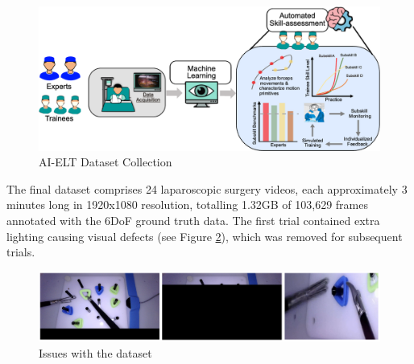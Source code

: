 \begin{figure}[tbp]
    \centering
    \vspace*{-2.5mm}
    \includegraphics[width=1\linewidth]{dataset_collection.png}
    \vspace*{-6.5mm}
    \caption{AI-ELT Dataset Collection}
    \vspace*{-3mm}
    \label{fig:dataset-collection}
\end{figure}


The final dataset comprises 24 laparoscopic surgery videos, each approximately 3 minutes long in 1920x1080 resolution, totalling 1.32GB of 103,629 frames annotated with the 6DoF ground truth data. The first trial contained extra lighting causing visual defects (see Figure \ref{fig:test1_issues}), which was removed for subsequent trials.

\begin{figure}[htbp]
    \centering
    \vspace{-2.5mm}
    \includegraphics[width=1\linewidth]{test1_issues}
    \vspace*{-7.5mm}
    \caption{Issues with the dataset}
    \vspace*{-5mm}
    \label{fig:test1_issues}
\end{figure}

